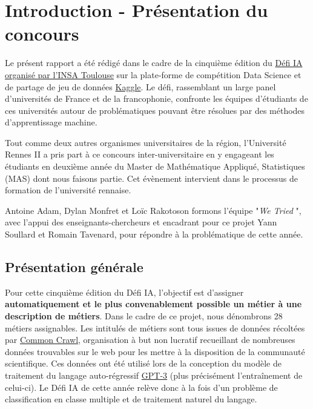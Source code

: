 \chapter{Introduction - Présentation du concours}

Le présent rapport a été rédigé dans le cadre de la cinquième édition du \href{https://www.kaggle.com/c/defi-ia-insa-toulouse}{Défi IA organisé par l’INSA Toulouse} sur la plate-forme de compétition Data Science et de partage de jeu de données \href{https://www.kaggle.com/docs}{Kaggle}. Le défi, rassemblant un large panel d’universités de France et de la francophonie, confronte les équipes d’étudiants de ces universités autour de problématiques pouvant être résolues par des méthodes d’apprentissage machine.
\newline

Tout comme deux autres organismes universitaires de la région, l’Université Rennes II a pris part à ce concours inter-universitaire en y engageant les étudiants en deuxième année du Master de Mathématique Appliqué, Statistiques (MAS) dont nous faisons partie. Cet évènement intervient dans le processus de formation de l’université rennaise.
\newline

Antoine Adam, Dylan Monfret et Loïc Rakotoson formons l’équipe "\emph{We Tried} ", avec l’appui des enseignants-chercheurs et encadrant pour ce projet Yann Soullard et Romain Tavenard, pour répondre à la problématique de cette année.
\newline

\section{Présentation générale}

Pour cette cinquième édition du Défi IA, l’objectif est d’assigner \textbf{automatiquement et le plus convenablement possible un métier à une description de métiers}. Dans le cadre de ce projet, nous dénombrons 28 métiers assignables. Les intitulés de métiers sont tous issues de données récoltées par \href{https://en.wikipedia.org/wiki/Common_Crawl}{Common Crawl}, organisation à but non lucratif recueillant de nombreuses données trouvables sur le web pour les mettre à la disposition de la communauté scientifique. Ces données ont été utilisé lors de la conception du modèle de traitement du langage auto-régressif \href{https://fr.wikipedia.org/wiki/GPT-3}{GPT-3} (plus précisément l’entraînement de celui-ci). Le Défi IA de cette année relève donc à la fois d’un problème de classification en classe multiple et de traitement naturel du langage.
\newline


